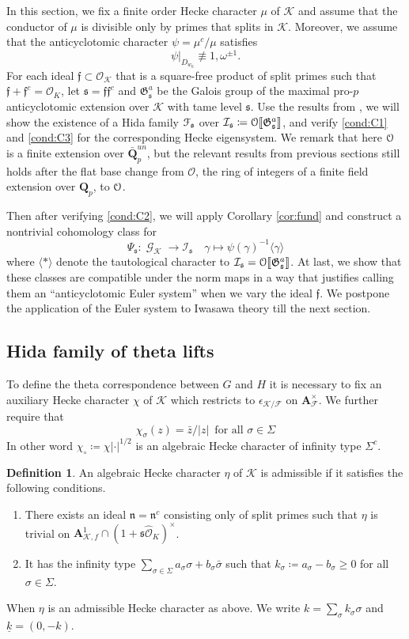 \documentclass[leqno]{amsart}
\theoremstyle{definition}
\newtheorem{defn}[thm]{Definition}
\theoremstyle{remark}
\newcommand{\oo}{\mathcal{O}}
\newcommand{\eo}{\EuScript{O}}
\newcommand{\Q}{{\mathbf{Q}}}
\newcommand{\Qp}{\mathbf{Q}_p}
\newcommand{\A}{\mathbf A}
\DeclareMathOperator{\Gal}{\mathcal{G}}
\newcommand{\ff}{\mathfrak{f}}
\newcommand{\fn}{\mathfrak{n}}
\newcommand{\fs}{\mathfrak{s}}
\newcommand{\F}{{\mathcal{F}}} %
\newcommand{\K}{{\mathcal{K}}} %
\newcommand{\qch}{\epsilon} %
\newcommand{\fG}{\mathfrak{G}}
\newcommand{\wt}[1]{\underline{ #1 }}
\newcommand{\euF}{\EuScript{F}} %
\newcommand{\I}{\mathcal{I}} %
\begin{document}
In this section,
we fix a finite order Hecke character $\mu$ of $\K$
and assume that the conductor of $\mu$
is divisible only by primes that splits in $\K$.
Moreover, we assume that the anticyclotomic character
$\psi=\mu^c/\mu$ satisfies
\begin{equation}\label{cond:gen_psi}\tag{gen}
    \psi\vert_{D_{w_0}}\not\equiv 1,\omega^{\pm1}.
\end{equation}
For each ideal $\ff\subset \oo_\K$
that is a square-free product of split primes
such that $\ff+\ff^c=\oo_K$,
let $\fs=\ff\ff^c$
and $\fG^a_{\fs}$ be the Galois group
of the maximal pro-$p$ anticyclotomic
extension over $\K$ with tame level $\fs$.
Use the results from \cite{lee},
we will show the existence of a Hida family
$\euF_\fs$ over $\I_\fs\coloneqq \eo\llbracket\fG_\fs^a\rrbracket$,
and verify \ref{cond:C1} and \ref{cond:C3}
for the corresponding Hecke eigensystem.
We remark that here $\eo$ is a finite extension
over $\bar{\Q}_p^{un}$,
but the relevant results from previous sections still holds 
after the flat base change from $\oo$,
the ring of integers of a finite field extension over $\Qp$,
to $\eo$.

Then after verifying \ref{cond:C2},
we will apply Corollary \ref{cor:fund}
and construct a nontrivial cohomology class for 
\[
    \Psi_\fs\colon\Gal_\K\to \I_\fs\quad
    \gamma\mapsto \psi(\gamma)^{-1}\langle \gamma\rangle
\]
where $\langle*\rangle$ denote the tautological character
to $\I_\fs=\eo\llbracket\fG_\fs^a\rrbracket$.
At last, we show that these classes are compatible under the norm maps 
in a way that justifies calling them
an ``anticyclotomic Euler system''
when we vary the ideal $\ff$.
We postpone the application of the Euler system
to Iwasawa theory till the next section.


\subsection{Hida family of theta lifts}


To define the theta correspondence between $G$ and $H$
it is necessary to fix an auxiliary Hecke character
$\chi$ of $\K$ which restricts to 
$\qch_{\K/\F}$ on $\A_\F^\times$.
We further require that
\[
\chi_\sigma(z)=\bar{z}/|z|\,
\text{ for all }\sigma\in \Sigma 
\]
In other word $\chi_\circ\coloneqq \chi|\cdot|^{1/2}$
is an algebraic Hecke character
of infinity type $\Sigma^c$.

\begin{defn}\label{def:admchar}
An algebraic Hecke character $\eta$ of $\K$ is admissible
if it satisfies the following conditions.
\begin{enumerate}
\item 
There exists an ideal $\fn=\fn^c$
consisting only of split primes such that 
$\eta$ is trivial on
$\A_{\K,f}^1\cap (1+\fs\widehat{\oo}_K)^\times$.
\item 
It has the infinity type
$\sum_{\sigma\in\Sigma}a_\sigma\sigma+b_\sigma\bar{\sigma}$
such that 
$k_\sigma\coloneqq a_\sigma-b_\sigma\geq0$
for all $\sigma\in\Sigma$.
\end{enumerate}
When $\eta$ is an admissible Hecke character as above.
We write $k=\sum_{\sigma}k_\sigma\sigma$ and $\wt{k}=(0,-k)$.
\end{defn}
\end{document}
